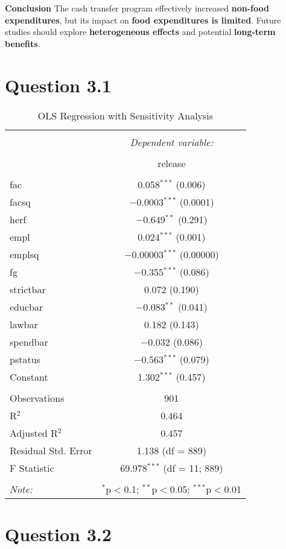 \documentclass[12pt, oneside]{article}
\begin{document}
\textbf{Conclusion}
The cash transfer program effectively increased \textbf{non-food expenditures}, but its impact on \textbf{food expenditures is limited}. Future studies should explore \textbf{heterogeneous effects} and potential \textbf{long-term benefits}.

\section{Question 3.1}
\begin{table}[!htbp] \centering 
    \caption{OLS Regression with Sensitivity Analysis} 
    \label{} 
  \begin{tabular}{@{\extracolsep{5pt}}lc} 
  \\[-1.8ex]\hline 
  \hline \\[-1.8ex] 
   & \multicolumn{1}{c}{\textit{Dependent variable:}} \\ 
  \cline{2-2} 
  \\[-1.8ex] & release \\ 
  \hline \\[-1.8ex] 
   fac & 0.058$^{***}$ (0.006) \\ 
    facsq & $-$0.0003$^{***}$ (0.0001) \\ 
    herf & $-$0.649$^{**}$ (0.291) \\ 
    empl & 0.024$^{***}$ (0.001) \\ 
    emplsq & $-$0.00003$^{***}$ (0.00000) \\ 
    fg & $-$0.355$^{***}$ (0.086) \\ 
    strictbar & 0.072 (0.190) \\ 
    educbar & $-$0.083$^{**}$ (0.041) \\ 
    lawbar & 0.182 (0.143) \\ 
    spendbar & $-$0.032 (0.086) \\ 
    pstatus & $-$0.563$^{***}$ (0.079) \\ 
    Constant & 1.302$^{***}$ (0.457) \\ 
   \hline \\[-1.8ex] 
  Observations & 901 \\ 
  R$^{2}$ & 0.464 \\ 
  Adjusted R$^{2}$ & 0.457 \\ 
  Residual Std. Error & 1.138 (df = 889) \\ 
  F Statistic & 69.978$^{***}$ (df = 11; 889) \\ 
  \hline 
  \hline \\[-1.8ex] 
  \textit{Note:}  & \multicolumn{1}{r}{$^{*}$p$<$0.1; $^{**}$p$<$0.05; $^{***}$p$<$0.01} \\ 
  \end{tabular} 
  \end{table} 

\section{Question 3.2}
\end{document}
